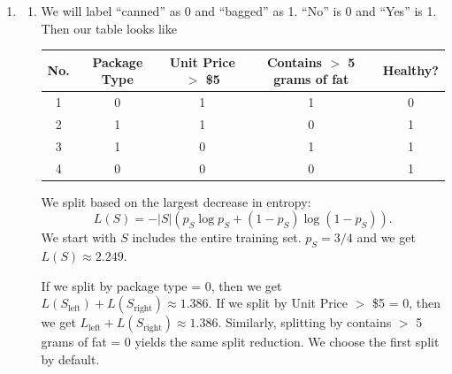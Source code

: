 \documentclass[12pt]{article}
\begin{document}
\begin{enumerate}[leftmargin=*]
\item
\begin{enumerate}[label=\Alph*.]
\item We will label ``canned'' as 0 and ``bagged'' as 1. ``No'' is 0 and ``Yes'' is 1. Then our table looks like
\begin{center}
\begin{tabular}{c| c c c | c}
\hline
No. & Package Type & Unit Price $>$ \$5 & Contains $>$ 5 grams of fat & Healthy? \\ \hline
1 & 0 & 1 & 1 & 0 \\
2 & 1 & 1 & 0 & 1 \\
3 & 1 & 0 & 1 & 1 \\
4 & 0 & 0 & 0 & 1 \\ \hline
\end{tabular}
\end{center}
We split based on the largest decrease in entropy:
\[ L(S) = -|S| (p_S \log p_S + (1 - p_S) \log(1 - p_S)). \]
We start with $S$ includes the entire training set. $p_S = 3/4$ and we get $L(S) \approx 2.249$.

If we split by package type = 0, then we get $L(S_{\text{left}}) + L(S_{\text{right}}) \approx 1.386$.
If we split by Unit Price $>$ \$5 = 0, then we get $L_{\text{left}} + L(S_{\text{right}}) \approx 1.386$.
Similarly, splitting by contains $>$ 5 grams of fat = 0 yields the same split reduction. We choose the first split by default.


\end{enumerate}
\end{enumerate}
\end{document}
